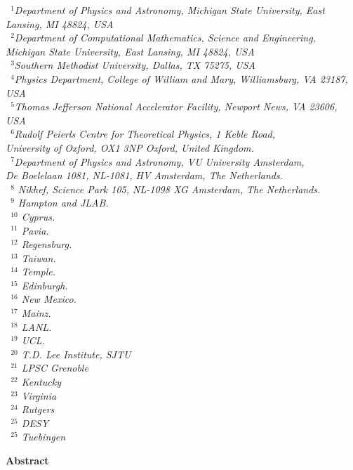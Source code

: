 \documentclass[11pt,a4paper]{article}
\numberwithin{equation}{section}
\numberwithin{figure}{section}
\numberwithin{table}{section}
\begin{document}
\begin{center}
\vspace{.2cm}
{\it \small
~$^{1}$Department of Physics and Astronomy, Michigan State University, East Lansing, MI 48824, USA\\
~$^{2}$Department of Computational Mathematics, Science and Engineering, \\Michigan State University, East Lansing, MI 48824, USA\\
~$^{3}$Southern Methodist University, Dallas, TX 75275, USA\\
~$^{4}$Physics Department, College of William and Mary, Williamsburg, VA 23187, USA\\
~$^{5}$Thomas Jefferson National Accelerator Facility, Newport News, VA 23606, USA\\
~$^6$Rudolf Peierls Centre for Theoretical Physics, 1 Keble Road,\\ University of Oxford, OX1 3NP Oxford, United Kingdom.\\
~$^{7}$Department of Physics and Astronomy, VU University Amsterdam,\\
De Boelelaan 1081, NL-1081, HV Amsterdam, The Netherlands.\\
~$^{8}$ Nikhef, Science Park 105, NL-1098 XG Amsterdam, The Netherlands.\\
~$^{9}$ Hampton and JLAB. \\
~$^{10}$ Cyprus. \\
~$^{11}$ Pavia. \\
~$^{12}$ Regensburg. \\
~$^{13}$ Taiwan. \\
~$^{14}$ Temple. \\
~$^{15}$ Edinburgh. \\
~$^{16}$ New Mexico. \\
~$^{17}$ Mainz. \\
~$^{18}$ LANL. \\
~$^{19}$ UCL. \\
~$^{20}$ T.D. Lee Institute, SJTU \\
~$^{21}$ LPSC Grenoble \\
~$^{22}$ Kentucky \\
~$^{23}$ Virginia \\
~$^{24}$ Rutgers \\
~$^{25}$ DESY \\
~$^{25}$ Tuebingen \\
}

\clearpage

{\bf \large Abstract}


\end{center}
\end{document}
